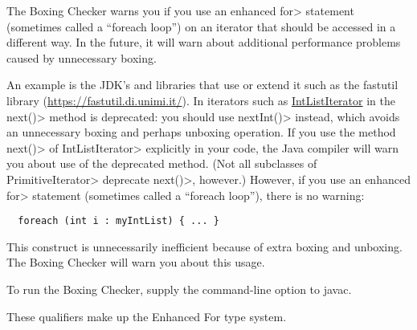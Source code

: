 \htmlhr
{}

The Boxing Checker warns you if you use an enhanced \<for> statement
(sometimes called a ``foreach loop'') on an iterator that should be
accessed in a different way.
In the future, it will warn about additional performance problems caused by
unnecessary boxing.

An example is the JDK's
and libraries that use or extend it such as the fastutil library (\url{https://fastutil.di.unimi.it/}).
In iterators such as
\href{https://fastutil.di.unimi.it/docs/it/unimi/dsi/fastutil/ints/IntListIterator.html}{\<IntListIterator\>}
in the \<next()> method is deprecated:  you should use \<nextInt()> instead,
which avoids an unnecessary boxing and perhaps unboxing operation.  If you use the
method \<next()> of \<IntListIterator> explicitly in your code, the Java compiler will warn you
about use of the deprecated method.  (Not all subclasses of
\<PrimitiveIterator> deprecate \<next()>, however.)
However, if you use an enhanced \<for> statement (sometimes called a ``foreach
loop''), there is no warning:

\begin{Verbatim}
  foreach (int i : myIntList) { ... }
\end{Verbatim}

\noindent
This construct is unnecessarily inefficient because of extra boxing and unboxing.
The Boxing Checker will warn you about this usage.

To run the Boxing Checker, supply the
command-line option to javac.



These qualifiers make up the Enhanced For type system.

